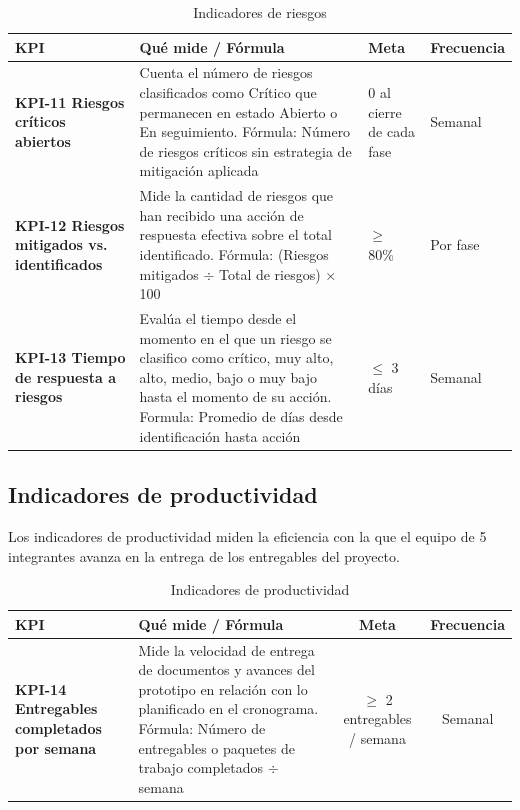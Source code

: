 \documentclass[11pt,spanish]{article}
\begin{document}
\begin{table}[H]
\centering
\small
\caption{Indicadores de riesgos}\label{tab:indicadores-riesgos}
\begin{tabularx}{\textwidth}{p{4.5cm} Y p{3cm} p{2.5cm}}
\toprule
\textbf{KPI} & \textbf{Qué mide / Fórmula} & \textbf{Meta} & \textbf{Frecuencia} \\
\midrule
\textbf{KPI-11 Riesgos críticos abiertos} & Cuenta el número de riesgos clasificados como Crítico que permanecen en estado Abierto o En seguimiento. Fórmula: Número de riesgos críticos sin estrategia de mitigación aplicada & 0 al cierre de cada fase & Semanal \\
\textbf{KPI-12 Riesgos mitigados vs. identificados} & Mide la cantidad de riesgos que han recibido una acción de respuesta efectiva sobre el total identificado. Fórmula: (Riesgos mitigados $\div$ Total de riesgos) $\times$ 100 & $\geq$ 80\% & Por fase \\
\textbf{KPI-13 Tiempo de respuesta a riesgos} & Evalúa el tiempo desde el momento en el que un riesgo se clasifico como crítico, muy alto, alto, medio, bajo o muy bajo hasta el momento de su acción. Formula: Promedio de días desde identificación hasta acción & $\leq$ 3 días & Semanal \\
\bottomrule
\end{tabularx}
\end{table}

\subsection{Indicadores de productividad}

Los indicadores de productividad miden la eficiencia con la que el equipo de 5 integrantes avanza en la entrega de los entregables del proyecto.

\begin{table}[H]
\centering
\small
\caption{Indicadores de productividad}\label{tab:indicadores-productividad}
\begin{tabularx}{\textwidth}{p{4.5cm} Y c c}
\toprule
\textbf{KPI} & \textbf{Qué mide / Fórmula} & \textbf{Meta} & \textbf{Frecuencia} \\
\midrule
\textbf{KPI-14 Entregables completados por semana} & Mide la velocidad de entrega de documentos y avances del prototipo en relación con lo planificado en el cronograma. Fórmula: Número de entregables o paquetes de trabajo completados $\div$ semana & $\geq$ 2 entregables / semana & Semanal \\
\bottomrule
\end{tabularx}
\end{table}
\end{document}

